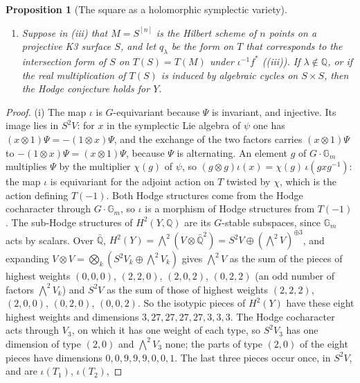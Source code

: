 \documentclass[11pt,reqno]{amsart}
\theoremstyle{plain}
\newtheorem{proposition}[theorem]{Proposition}
\theoremstyle{definition}
\theoremstyle{remark}
\newcommand{\QQ}{\mathbb{Q}}
\begin{document}
\begin{proposition}[The square as a holomorphic symplectic
variety]
\begin{enumerate}[label=\textup{(\roman*)},leftmargin=2.6em,itemsep=2pt]
  products of classes in $T(M)$; $f$ is generically finite onto a subvariety
  of dimension eight on which $\sigma_{M}$ is generically nondegenerate;
  $b_{2}(M)\ge10$; and $\dim M\ge10$.
\item Suppose in (iii) that $M=S^{[n]}$ is the Hilbert scheme of $n$ points
  on a projective K3 surface $S$, and
  let $q_{\lambda}$ be the form on $T$ that corresponds to the intersection
  form of $S$ on $T(S)=T(M)$ under $\iota^{-1}f^{*}$
  ((iii)). If $\lambda\notin\QQ$, or if the real
  multiplication of $T(S)$ is induced by algebraic cycles on $S\times S$,
  then the Hodge conjecture holds for $Y$.
\end{enumerate}
\end{proposition}

\begin{proof}
(i) The map $\iota$ is $G$-equivariant because $\Psi$ is invariant, and
injective. Its image lies in $S^{2}V$: for $x$ in the symplectic Lie algebra
of $\psi$ one has $(x\otimes1)\Psi=-(1\otimes x)\Psi$, and the exchange of the
two factors carries $(x\otimes1)\Psi$ to $-(1\otimes x)\Psi=(x\otimes1)\Psi$,
because $\Psi$ is alternating. An element $g$ of $G\cdot\mathbb{G}_{m}$
multiplies $\Psi$ by the multiplier $\chi(g)$ of $\psi$, so $(g\otimes g)\iota(x)=
\chi(g)\,\iota(gxg^{-1})$: the map $\iota$ is equivariant for the adjoint
action on $T$ twisted by $\chi$, which is the action defining $T(-1)$. Both
Hodge structures come from the Hodge cocharacter through
$G\cdot\mathbb{G}_{m}$, so $\iota$ is a morphism of Hodge structures from
$T(-1)$. The sub-Hodge structures of $H^{2}(Y,\QQ)$ are its $G$-stable
subspaces, since $\mathbb{G}_{m}$ acts by scalars. Over $\bar{\QQ}$,
$H^{2}(Y)=\bigwedge^{2}(V\otimes\bar{\QQ}^{2})=S^{2}V\oplus(\bigwedge^{2}V)^{\oplus3}$,
and expanding $V\otimes V=\bigotimes_{k}(S^{2}V_{k}\oplus\bigwedge^{2}V_{k})$
gives $\bigwedge^{2}V$ as the sum of the pieces of highest weights $(0,0,0)$,
$(2,2,0)$, $(2,0,2)$, $(0,2,2)$ (an odd number of factors $\bigwedge^{2}V_{k}$)
and $S^{2}V$ as the sum of those of highest weights $(2,2,2)$, $(2,0,0)$,
$(0,2,0)$, $(0,0,2)$. So the isotypic pieces of $H^{2}(Y)$ have these eight
highest weights and dimensions $3,27,27,27,27,3,3,3$. The Hodge cocharacter
acts through $V_{3}$, on which it has one weight of each type, so $S^{2}V_{3}$
has one dimension of type $(2,0)$ and $\bigwedge^{2}V_{3}$ none; the parts of
type $(2,0)$ of the eight pieces have dimensions $0,0,9,9,9,0,0,1$. The last
three pieces occur once, in $S^{2}V$, and are $\iota(T_{1})$, $\iota(T_{2})$,

\end{proof}
\end{document}
